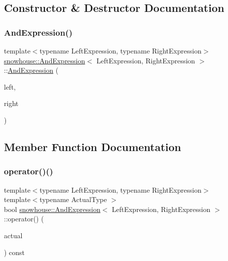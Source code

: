 \subsection{Constructor \& Destructor Documentation}
\mbox{\label{structsnowhouse_1_1AndExpression_a4a9dea7812d63087e993b8a5b7a3064e}} 
\subsubsection{\texorpdfstring{AndExpression()}{AndExpression()}}
{\footnotesize\ttfamily template$<$typename Left\+Expression, typename Right\+Expression$>$ \\
\mbox{\hyperlink{structsnowhouse_1_1AndExpression}{snowhouse\+::\+And\+Expression}}$<$ Left\+Expression, Right\+Expression $>$\+::\mbox{\hyperlink{structsnowhouse_1_1AndExpression}{And\+Expression}} (\begin{DoxyParamCaption}\item[{const Left\+Expression \&}]{left,  }\item[{const Right\+Expression \&}]{right }\end{DoxyParamCaption})\hspace{0.3cm}{\ttfamily [inline]}}



\subsection{Member Function Documentation}
\mbox{\label{structsnowhouse_1_1AndExpression_a1db2b9dff5519ca891b992db3eae314e}} 
\subsubsection{\texorpdfstring{operator()()}{operator()()}}
{\footnotesize\ttfamily template$<$typename Left\+Expression, typename Right\+Expression$>$ \\
template$<$typename Actual\+Type $>$ \\
bool \mbox{\hyperlink{structsnowhouse_1_1AndExpression}{snowhouse\+::\+And\+Expression}}$<$ Left\+Expression, Right\+Expression $>$\+::operator() (\begin{DoxyParamCaption}\item[{const Actual\+Type \&}]{actual }\end{DoxyParamCaption}) const\hspace{0.3cm}{\ttfamily [inline]}}



